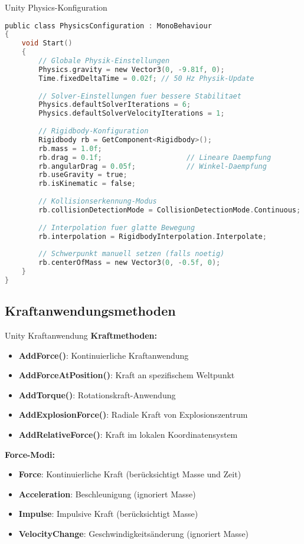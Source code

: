 \begin{code}{Unity Physics-Konfiguration}
\begin{lstlisting}[language=C, style=basesmol]
public class PhysicsConfiguration : MonoBehaviour 
{
    void Start() 
    {
        // Globale Physik-Einstellungen
        Physics.gravity = new Vector3(0, -9.81f, 0);
        Time.fixedDeltaTime = 0.02f; // 50 Hz Physik-Update
        
        // Solver-Einstellungen fuer bessere Stabilitaet
        Physics.defaultSolverIterations = 6;
        Physics.defaultSolverVelocityIterations = 1;
        
        // Rigidbody-Konfiguration
        Rigidbody rb = GetComponent<Rigidbody>();
        rb.mass = 1.0f;
        rb.drag = 0.1f;                    // Lineare Daempfung
        rb.angularDrag = 0.05f;            // Winkel-Daempfung
        rb.useGravity = true;
        rb.isKinematic = false;
        
        // Kollisionserkennung-Modus
        rb.collisionDetectionMode = CollisionDetectionMode.Continuous;
        
        // Interpolation fuer glatte Bewegung
        rb.interpolation = RigidbodyInterpolation.Interpolate;
        
        // Schwerpunkt manuell setzen (falls noetig)
        rb.centerOfMass = new Vector3(0, -0.5f, 0);
    }
}
\end{lstlisting}
\end{code}

\subsection{Kraftanwendungsmethoden}

\begin{definition}{Unity Kraftanwendung}
    \textbf{Kraftmethoden:}
    \begin{itemize}
        \item \textbf{AddForce()}: Kontinuierliche Kraftanwendung
        \item \textbf{AddForceAtPosition()}: Kraft an spezifischem Weltpunkt
        \item \textbf{AddTorque()}: Rotationskraft-Anwendung
        \item \textbf{AddExplosionForce()}: Radiale Kraft von Explosionszentrum
        \item \textbf{AddRelativeForce()}: Kraft im lokalen Koordinatensystem
    \end{itemize}
    
    \textbf{Force-Modi:}
    \begin{itemize}
        \item \textbf{Force}: Kontinuierliche Kraft (berücksichtigt Masse und Zeit)
        \item \textbf{Acceleration}: Beschleunigung (ignoriert Masse)
        \item \textbf{Impulse}: Impulsive Kraft (berücksichtigt Masse)
        \item \textbf{VelocityChange}: Geschwindigkeitsänderung (ignoriert Masse)
    \end{itemize}
\end{definition}

